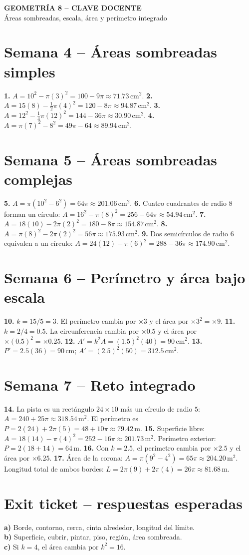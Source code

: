 \documentclass[11pt]{article}
\begin{document}
\begin{center}
{\Large\bfseries GEOMETR\'IA 8 -- CLAVE DOCENTE}\\[3pt]
{\large \'Areas sombreadas, escala, \'area y per\'imetro integrado}
\end{center}
\section*{Semana 4 -- \'Areas sombreadas simples}
\textbf{1.} $A=10^2-\pi(3)^2=100-9\pi\approx71.73\,\mathrm{cm}^2$.
\textbf{2.} $A=15(8)-\frac12\pi(4)^2=120-8\pi\approx94.87\,\mathrm{cm}^2$.
\textbf{3.} $A=12^2-\frac14\pi(12)^2=144-36\pi\approx30.90\,\mathrm{cm}^2$.
\textbf{4.} $A=\pi(7)^2-8^2=49\pi-64\approx89.94\,\mathrm{cm}^2$.
\section*{Semana 5 -- \'Areas sombreadas complejas}
\textbf{5.} $A=\pi(10^2-6^2)=64\pi\approx201.06\,\mathrm{cm}^2$.
\textbf{6.} Cuatro cuadrantes de radio $8$ forman un c\'irculo: $A=16^2-\pi(8)^2=256-64\pi\approx54.94\,\mathrm{cm}^2$.
\textbf{7.} $A=18(10)-2\pi(2)^2=180-8\pi\approx154.87\,\mathrm{cm}^2$.
\textbf{8.} $A=\pi(8)^2-2\pi(2)^2=56\pi\approx175.93\,\mathrm{cm}^2$.
\textbf{9.} Dos semic\'irculos de radio $6$ equivalen a un c\'irculo: $A=24(12)-\pi(6)^2=288-36\pi\approx174.90\,\mathrm{cm}^2$.
\section*{Semana 6 -- Per\'imetro y \'area bajo escala}
\textbf{10.} $k=15/5=3$. El per\'imetro cambia por $\times3$ y el \'area por $\times3^2=\times9$.
\textbf{11.} $k=2/4=0.5$. La circunferencia cambia por $\times0.5$ y el \'area por $\times(0.5)^2=\times0.25$.
\textbf{12.} $A'=k^2A=(1.5)^2(40)=90\,\mathrm{cm}^2$.
\textbf{13.} $P'=2.5(36)=90\,\mathrm{cm}$; $A'=(2.5)^2(50)=312.5\,\mathrm{cm}^2$.
\section*{Semana 7 -- Reto integrado}
\textbf{14.} La pista es un rect\'angulo $24\times10$ m\'as un c\'irculo de radio $5$: $A=240+25\pi\approx318.54\,\mathrm{m}^2$. El per\'imetro es $P=2(24)+2\pi(5)=48+10\pi\approx79.42\,\mathrm{m}$.
\textbf{15.} Superficie libre: $A=18(14)-\pi(4)^2=252-16\pi\approx201.73\,\mathrm{m}^2$. Per\'imetro exterior: $P=2(18+14)=64\,\mathrm{m}$.
\textbf{16.} Con $k=2.5$, el per\'imetro cambia por $\times2.5$ y el \'area por $\times6.25$.
\textbf{17.} \'Area de la corona: $A=\pi(9^2-4^2)=65\pi\approx204.20\,\mathrm{m}^2$. Longitud total de ambos bordes: $L=2\pi(9)+2\pi(4)=26\pi\approx81.68\,\mathrm{m}$.
\section*{Exit ticket -- respuestas esperadas}
\textbf{a)} Borde, contorno, cerca, cinta alrededor, longitud del l\'imite.\\
\textbf{b)} Superficie, cubrir, pintar, piso, regi\'on, \'area sombreada.\\
\textbf{c)} Si $k=4$, el \'area cambia por $k^2=16$.
\end{document}
